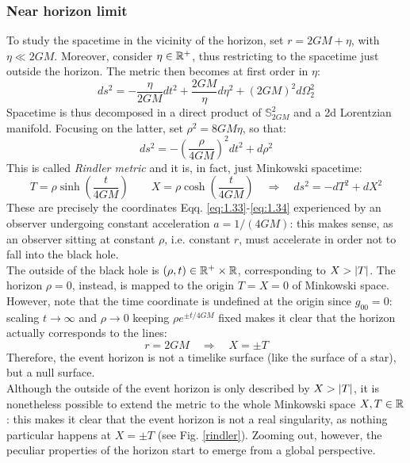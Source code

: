 \subsubsection{Near horizon limit}

To study the spacetime in the vicinity of the horizon, set $ r = 2GM + \eta $, with $ \eta \ll 2GM $. Moreover, consider $ \eta \in \mathbb{R}^+ $, thus restricting to the spacetime just outside the horizon. The metric then becomes at first order in $ \eta $:
\begin{equation*}
  ds^2 = - \frac{\eta}{2GM} dt^2 + \frac{2GM}{\eta} d\eta^2 + (2GM)^2 d\Omega_2^2
\end{equation*}
Spacetime is thus decomposed in a direct product of $ \mathbb{S}^2_{2GM} $ and a 2d Lorentzian manifold. Focusing on the latter, set $ \rho^2 = 8GM \eta $, so that:
\begin{equation}
  ds^2 = - \left( \frac{\rho}{4GM} \right)^2 dt^2 + d\rho^2
  \label{eq:6.3}
\end{equation}
This is called \textit{Rindler metric} and it is, in fact, just Minkowski spacetime:
\begin{equation*}
  T = \rho \sinh \left( \frac{t}{4GM} \right)
  \qquad
  X = \rho \cosh \left( \frac{t}{4GM} \right)
  \quad \Rightarrow \quad
  ds^2 = - dT^2 + dX^2
\end{equation*}
These are precisely the coordinates Eqq. \ref{eq:1.33}-\ref{eq:1.34} experienced by an observer undergoing constant acceleration $ a = 1 / (4GM) $: this makes sense, as an observer sitting at constant $ \rho $, i.e. constant $ r $, must accelerate in order not to fall into the black hole.\\
The outside of the black hole is $ (\rho,t) \in \mathbb{R}^+ \times \mathbb{R} $, corresponding to $ X > \left\lvert T\right\rvert $. The horizon $ \rho = 0 $, instead, is mapped to the origin $ T = X = 0 $ of Minkowski space. However, note that the time coordinate is undefined at the origin since $ g_{00} = 0 $: scaling $ t \rightarrow \infty $ and $ \rho \rightarrow 0 $ keeping $ \rho e^{\pm t / 4GM} $ fixed makes it clear that the horizon actually corresponds to the lines:
\begin{equation*}
  r = 2GM \quad \Rightarrow \quad X = \pm T
\end{equation*}
Therefore, the event horizon is not a timelike surface (like the surface of a star), but a null surface.\\
Although the outside of the event horizon is only described by $ X > \left\lvert T\right\rvert $, it is nonetheless possible to extend the metric to the whole Minkowski space $ X,T \in \mathbb{R} $: this makes it clear that the event horizon is not a real singularity, as nothing particular happens at $ X = \pm T $ (see Fig. \ref{rindler}). Zooming out, however, the peculiar properties of the horizon start to emerge from a global perspective.

